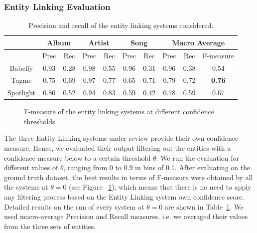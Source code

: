 \subsubsection{Entity Linking Evaluation}

\begin{table}[]
\scriptsize
\centering
	\begin{tabular}{ c c c c c c c c c c }
	\hline
& \multicolumn{2}{c}{Album} & \multicolumn{2}{c}{Artist} & \multicolumn{2}{c}{Song} & \multicolumn{3}{c}{Macro Average}  \\
\hline
	& Prec & Rec & Prec & Rec & Prec & Rec & Prec & Rec & F-measure \\
	\hline
Babelfy & 0.93 & 0.28 & 0.98 & 0.55 & 0.96 & 0.31 & 0.96 & 0.38 & 0.54 \\
Tagme & 0.75 & 0.69 & 0.97 & 0.77 & 0.65 & 0.71 & 0.79 & 0.72 & \textbf{0.76} \\
Spotlight & 0.80 & 0.52 & 0.94 & 0.83 & 0.59 & 0.42 & 0.78 & 0.59 & 0.67 \\
\hline
	\end{tabular}
	\caption{Precision and recall of the entity linking systems considered.}
	\label{tbl:kb:res_categories}
\end{table}

\begin{figure}[!htp]
\centerline{}
\caption{F-measure of the entity linking systems at different confidence thresholds}
\label{fig:kb:confidence_el}
\end{figure}

The three Entity Linking systems under review provide their own confidence measure. Hence, we evaluated their output filtering out the entities with a confidence measure below to a certain threshold $\theta$. We run the evaluation for different values of $\theta$, ranging from 0 to 0.9 in bins of 0.1. After evaluating on the ground truth dataset, the best results in terms of F-measure were obtained by all the systems at $\theta = 0$ (see Figure ~\ref{fig:kb:confidence_el}), which means that there is no need to apply any filtering process based on the Entity Linking system own confidence score. Detailed results on the run of every system at $\theta = 0$ are shown in Table~\ref{tbl:kb:res_categories}. We used macro-average Precision and Recall measures, i.e. we averaged their values from the three sets of entities.

